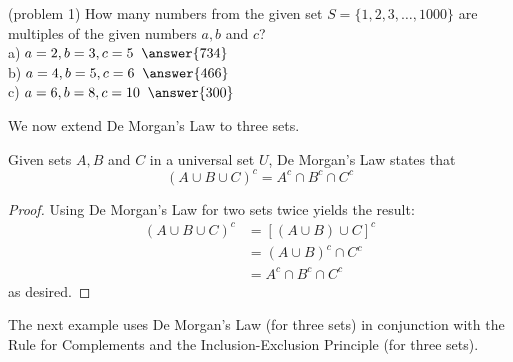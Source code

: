 \documentclass[handout]{ximera}
\begin{document}
\begin{problem}(problem 1)
How many numbers from the given set $S= \{1,2,3, \ldots, 1000\}$ are multiples of the given numbers $a, b$ and $c$?\\
a)$\; a = 2, b = 3 , c = 5\;\; \answer{734}$\\
b)$\;  a = 4, b= 5, c = 6 \;\; \answer{466}$\\
c)$\; a = 6, b= 8, c = 10 \;\; \answer{300}$\\

\end{problem}


We now extend De Morgan's Law to three sets.
\begin{proposition}
Given sets $A, B$ and $C$ in a universal set $U$, De Morgan's Law states that
\[
\left(A \cup B \cup C\right)^c = A^c \cap B^c \cap C^c
\]
\end{proposition}

\begin{proof}
Using De Morgan's Law for two sets twice yields the result:
\begin{align*}
\left(A \cup B \cup C\right)^c &= \left[(A \cup B) \cup C\right]^c \\
        &= (A \cup B)^c \cap C^c \\
        &= A^c \cap B^c \cap C^c
\end{align*}
as desired.
\end{proof}



The next example uses De Morgan's Law (for three sets) in conjunction with the Rule for Complements and the 
Inclusion-Exclusion Principle (for three sets).
\end{document}
